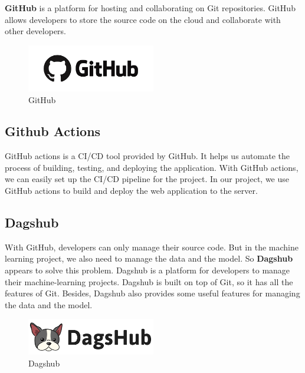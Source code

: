 \noindent \textbf{GitHub} is a platform for hosting and collaborating on Git repositories. GitHub allows developers to store the source code on the cloud and collaborate with other developers.

\begin{figure}
    \centering
    \includegraphics[width=0.5\textwidth]{../Images/8.Technology_Stack/github_logo.png}
    \caption{GitHub}
    \label{fig:github}
\end{figure}

\subsection{Github Actions}
GitHub actions is a CI/CD tool provided by GitHub. It helps us automate the process of building, testing, and deploying the application. With GitHub actions, we can easily set up the CI/CD pipeline for the project. In our project, we use GitHub actions to build and deploy the web application to the server.

\subsection{Dagshub}
With GitHub, developers can only manage their source code. But in the machine learning project, we also need to manage the data and the model. So \textbf{Dagshub} appears to solve this problem.
Dagshub is a platform for developers to manage their machine-learning projects. Dagshub is built on top of Git, so it has all the features of Git. Besides, Dagshub also provides some useful features for managing the data and the model.

\begin{figure}[ht]
    \centering
    \includegraphics[width=0.5\textwidth]{../Images/8.Technology_Stack/dagshub_logo.png}
    \caption{Dagshub}
    \label{fig:dagshub}
\end{figure}


